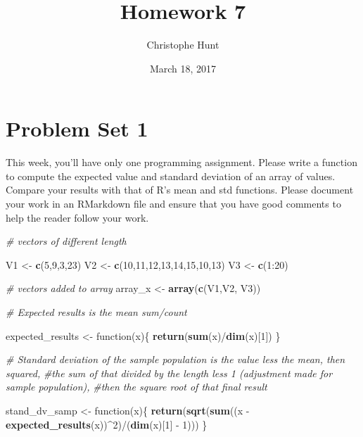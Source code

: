 \documentclass[]{article}
\title{Homework 7}
\author{Christophe Hunt}
\date{March 18, 2017}
\newenvironment{Shaded}{\begin{snugshade}}{\end{snugshade}}
\newcommand{\KeywordTok}[1]{\textcolor[rgb]{0.13,0.29,0.53}{\textbf{{#1}}}}
\newcommand{\DecValTok}[1]{\textcolor[rgb]{0.00,0.00,0.81}{{#1}}}
\newcommand{\StringTok}[1]{\textcolor[rgb]{0.31,0.60,0.02}{{#1}}}
\newcommand{\CommentTok}[1]{\textcolor[rgb]{0.56,0.35,0.01}{\textit{{#1}}}}
\newcommand{\NormalTok}[1]{{#1}}
\begin{document}
\maketitle

{
\setcounter{tocdepth}{2}
\tableofcontents
}
\section{Problem Set 1}\label{problem-set-1}

This week, you'll have only one programming assignment. Please write a
function to compute the expected value and standard deviation of an
array of values. Compare your results with that of R's mean and std
functions. Please document your work in an RMarkdown file and ensure
that you have good comments to help the reader follow your work.

\begin{Shaded}
\begin{Highlighting}[]
\CommentTok{# vectors of different length}

\NormalTok{V1 <-}\StringTok{ }\KeywordTok{c}\NormalTok{(}\DecValTok{5}\NormalTok{,}\DecValTok{9}\NormalTok{,}\DecValTok{3}\NormalTok{,}\DecValTok{23}\NormalTok{)}
\NormalTok{V2 <-}\StringTok{ }\KeywordTok{c}\NormalTok{(}\DecValTok{10}\NormalTok{,}\DecValTok{11}\NormalTok{,}\DecValTok{12}\NormalTok{,}\DecValTok{13}\NormalTok{,}\DecValTok{14}\NormalTok{,}\DecValTok{15}\NormalTok{,}\DecValTok{10}\NormalTok{,}\DecValTok{13}\NormalTok{)}
\NormalTok{V3 <-}\StringTok{ }\KeywordTok{c}\NormalTok{(}\DecValTok{1}\NormalTok{:}\DecValTok{20}\NormalTok{)}

\CommentTok{# vectors added to array}
\NormalTok{array_x <-}\StringTok{ }\KeywordTok{array}\NormalTok{(}\KeywordTok{c}\NormalTok{(V1,V2, V3))}

\CommentTok{# Expected results is the mean sum/count}

\NormalTok{expected_results <-}\StringTok{ }\NormalTok{function(x)\{}
  \KeywordTok{return}\NormalTok{(}\KeywordTok{sum}\NormalTok{(x)/}\KeywordTok{dim}\NormalTok{(x)[}\DecValTok{1}\NormalTok{])}
\NormalTok{\}}

\CommentTok{# Standard deviation of the sample population is the value less the mean, then squared, }
\CommentTok{#the sum of that divided by the length less 1 (adjustment made for sample population),}
\CommentTok{#then the square root of that final result}

\NormalTok{stand_dv_samp <-}\StringTok{ }\NormalTok{function(x)\{}
  \KeywordTok{return}\NormalTok{(}\KeywordTok{sqrt}\NormalTok{(}\KeywordTok{sum}\NormalTok{((x -}\StringTok{ }\KeywordTok{expected_results}\NormalTok{(x))^}\DecValTok{2}\NormalTok{)/(}\KeywordTok{dim}\NormalTok{(x)[}\DecValTok{1}\NormalTok{] -}\StringTok{ }\DecValTok{1}\NormalTok{)))}
\NormalTok{\}}
\end{Highlighting}
\end{Shaded}
\end{document}
